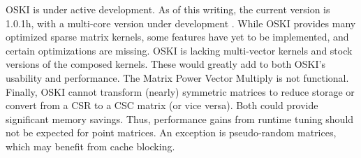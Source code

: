 OSKI is under active development.  As of this writing, the current version is 1.0.1h,
with a multi-core version under development \cite{IK:Vuduc-convo}.
While OSKI provides many optimized sparse matrix kernels,
some features have yet to be implemented, and certain optimizations are missing.
OSKI is lacking multi-vector kernels and stock versions of the composed kernels.
These would greatly add to both OSKI's usability and performance.
The Matrix Power Vector Multiply is not functional.
Finally, OSKI cannot transform (nearly) symmetric matrices to reduce storage or
convert from a CSR to a CSC matrix (or vice versa).  Both could
provide significant memory savings.
Thus, performance gains from runtime tuning should not be expected for point matrices.
An exception is pseudo-random matrices, which may benefit from cache blocking.
